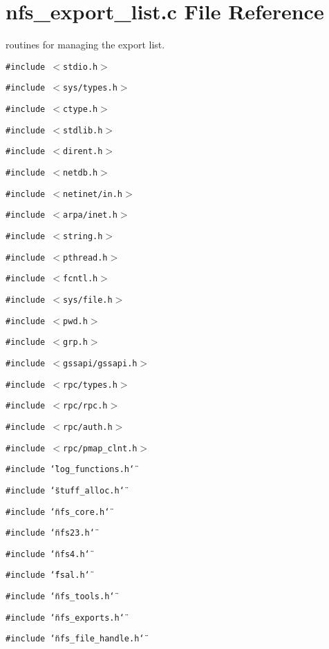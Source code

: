 \section{nfs\_\-export\_\-list.c File Reference}
\label{nfs__export__list_8c}
routines for managing the export list. 

{\tt \#include $<$stdio.h$>$}\par
{\tt \#include $<$sys/types.h$>$}\par
{\tt \#include $<$ctype.h$>$}\par
{\tt \#include $<$stdlib.h$>$}\par
{\tt \#include $<$dirent.h$>$}\par
{\tt \#include $<$netdb.h$>$}\par
{\tt \#include $<$netinet/in.h$>$}\par
{\tt \#include $<$arpa/inet.h$>$}\par
{\tt \#include $<$string.h$>$}\par
{\tt \#include $<$pthread.h$>$}\par
{\tt \#include $<$fcntl.h$>$}\par
{\tt \#include $<$sys/file.h$>$}\par
{\tt \#include $<$pwd.h$>$}\par
{\tt \#include $<$grp.h$>$}\par
{\tt \#include $<$gssapi/gssapi.h$>$}\par
{\tt \#include $<$rpc/types.h$>$}\par
{\tt \#include $<$rpc/rpc.h$>$}\par
{\tt \#include $<$rpc/auth.h$>$}\par
{\tt \#include $<$rpc/pmap\_\-clnt.h$>$}\par
{\tt \#include \char`\"{}log\_\-functions.h\char`\"{}}\par
{\tt \#include \char`\"{}stuff\_\-alloc.h\char`\"{}}\par
{\tt \#include \char`\"{}nfs\_\-core.h\char`\"{}}\par
{\tt \#include \char`\"{}nfs23.h\char`\"{}}\par
{\tt \#include \char`\"{}nfs4.h\char`\"{}}\par
{\tt \#include \char`\"{}fsal.h\char`\"{}}\par
{\tt \#include \char`\"{}nfs\_\-tools.h\char`\"{}}\par
{\tt \#include \char`\"{}nfs\_\-exports.h\char`\"{}}\par
{\tt \#include \char`\"{}nfs\_\-file\_\-handle.h\char`\"{}}\par
